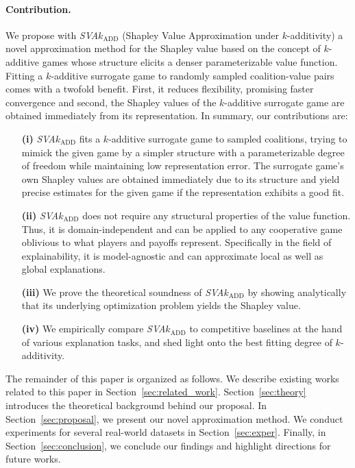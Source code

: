 \paragraph{Contribution.}
We propose with \emph{SVA}$k_{\text{ADD}}$ (Shapley Value Approximation under $k$-additivity) a novel approximation method for the Shapley value based on the concept of $k$-additive games whose structure elicits a denser parameterizable value function.
Fitting a $k$-additive surrogate game to randomly sampled coalition-value pairs comes with a twofold benefit.
First, it reduces flexibility, promising faster convergence and second, the Shapley values of the $k$-additive surrogate game are obtained immediately from its representation.
In summary, our contributions are:

\begin{itemize}
    \item[\textbf{(i)}] \emph{SVA}$k_{\text{ADD}}$ fits a $k$-additive surrogate game to sampled coalitions, trying to 
    mimick the given game by a simpler structure with a parameterizable degree of freedom while maintaining low representation error.
    The surrogate game's own Shapley values are obtained immediately due to its structure and yield precise estimates for the given game if the representation exhibits a good fit.

    \item[\textbf{(ii)}] \emph{SVA}$k_{\text{ADD}}$ does not require any structural properties of the value function.
    Thus, it is domain-independent and can be applied to any cooperative game oblivious to what players and payoffs represent.
    Specifically in the field of explainability, it is model-agnostic and can approximate local as well as global explanations.

    \item[\textbf{(iii)}] We prove the theoretical soundness of \emph{SVA}$k_{\text{ADD}}$ by showing analytically that its underlying optimization problem yields the Shapley value.
   
    \item[\textbf{(iv)}] We empirically compare \emph{SVA}$k_{\text{ADD}}$ to competitive baselines at the hand of various explanation tasks, and shed light onto the best fitting degree of $k$-additivity.
\end{itemize}

The remainder of this paper is organized as follows.
We describe existing works related to this paper in Section~\ref{sec:related_work}.
Section~\ref{sec:theory} introduces the theoretical background behind our proposal.
In Section~\ref{sec:proposal}, we present our novel approximation method.
We conduct experiments for several real-world datasets in Section~\ref{sec:exper}.
Finally, in Section~\ref{sec:conclusion}, we conclude our findings and highlight directions for future works.